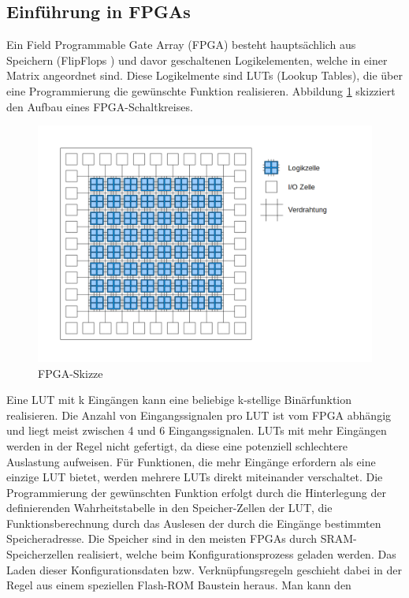 \subsection{Einführung in FPGAs}
\label{sec:intro_fpga}
Ein Field Programmable Gate Array (FPGA) besteht 
hauptsächlich aus Speichern (FlipFlops \cite{scarbata:2001}) 
und davor geschaltenen Logikelementen,
welche in einer Matrix angeordnet sind.
Diese Logikelmente sind LUTs
(Lookup Tables), die über eine Programmierung die
gewünschte Funktion realisieren. Abbildung \ref{fpga} 
skizziert den Aufbau eines FPGA-Schaltkreises.
\begin{figure}[h]
  \centering
  \includegraphics[width=\textwidth]{abb/fpga.png}
  \caption{FPGA-Skizze}
  \label{fpga}
\end{figure}
Eine LUT mit k Eingängen kann eine beliebige k-stellige
Binärfunktion realisieren. Die Anzahl von
Eingangssignalen pro LUT ist vom FPGA abhängig
und liegt meist zwischen 4 und 6 Eingangssignalen.
LUTs mit mehr Eingängen werden in der Regel nicht
gefertigt, da diese eine potenziell schlechtere
Auslastung aufweisen. Für Funktionen, die mehr
Eingänge erfordern als eine einzige LUT bietet,
werden mehrere LUTs direkt miteinander verschaltet.
Die Programmierung der gewünschten Funktion erfolgt
durch die Hinterlegung der definierenden Wahrheitstabelle
in den Speicher-Zellen der LUT, die Funktionsberechnung 
durch das Auslesen der durch die Eingänge bestimmten
Speicheradresse. Die Speicher sind in den meisten
FPGAs durch SRAM-Speicherzellen realisiert, welche
beim Konfigurationsprozess geladen werden.
Das Laden dieser Konfigurationsdaten bzw.
Verknüpfungsregeln geschieht dabei in der Regel aus
einem speziellen Flash-ROM Baustein heraus. Man kann den
